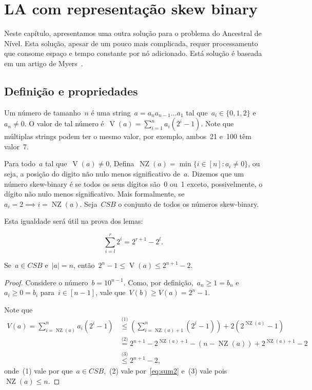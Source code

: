 \documentclass[main.tex]{subfiles}
\newcommand{\NZ}{\operatorname{NZ}}
\newcommand{\CSB}{\textit{CSB}}
\renewcommand{\V}{\operatorname{V}}
\begin{document}
\chapter{LA com representação skew binary} \label{cap:skew}

Neste capítulo, apresentamos uma outra solução para o problema do Ancestral de Nível. Esta solução, apesar de um pouco mais complicada, requer processamento que consome espaço e tempo constante por nó adicionado. Está solução é baseada em um artigo de Myers~\cite{Myers83}.

\section{Definição e propriedades}

Um número  de tamanho~$n$ é uma string~${a = a_n a_{n-1} \ldots a_1}$ tal que~${a_i \in \{0, 1, 2\}}$ e~$a_n \neq 0$. O valor de tal número é~${\V(a) = \sum\limits_{i = 1}^n{a_i (2^i - 1)}}$. Note que múltiplas strings podem ter o mesmo valor, por exemplo, ambos~21 e~100 têm valor~7.

Para todo~$a$ tal que~$\V(a) \neq 0$, Defina~$\NZ(a) = \min\{i \in [n] : a_i \neq 0\}$, ou seja, a posição do digito não nulo menos significativo de~$a$. Dizemos que um número skew-binary é  se todos os seus dígitos são~0 ou~1 exceto, possivelmente, o dígito não nulo menos significativo. Mais formalmente, se~${a_i = 2 \implies i = \NZ(a)}$. Seja~$\CSB$ o conjunto de todos os números skew-binary.

Esta igualdade será útil na prova dos lemas:

\begin{equation} \tag{A} \label{eq:sum2}
	\sum\limits_{i = l}^r{2^i} = 2^{r+1} - 2^{l}.
\end{equation}

\begin{lemma} \label{lem:csbdig}
	Se~$a \in \CSB$ e~$|a| = n$, então~$2^n - 1 \leq \V(a) \leq 2^{n+1}-2$.
\end{lemma}
\begin{proof}
	Considere o número~$b = 10^{n-1}$. Como, por definição,~$a_n \geq 1 = b_n$ e~$a_i \geq 0 = b_i$ para~$i \in [n - 1]$, vale que~$V(b) \geq V(a) = 2^n - 1$.

	Note que
	\begin{align*}
	V(a) = \sum\limits_{i = \NZ(a)}^n{a_i (2^i - 1)} &\stackrel{\text{(1)}}{\leq} \left(\sum\limits_{i = \NZ(a) + 1}^n (2^i - 1)\right) + 2 (2^{\NZ(a)} - 1) \\
	&\stackrel{\text{(2)}}{=} 2^{n+1} - 2^{\NZ(a)+1} - (n - \NZ(a)) + 2^{\NZ(a) + 1} - 2 \\
	&\stackrel{\text{(3)}}{\leq} 2^{n+1} - 2,
	\end{align*}
	onde~(1) vale por que~$a \in \CSB$,~(2) vale por~\eqref{eq:sum2} e~(3) vale pois~$\NZ(a) \leq n$.

\end{proof}
\end{document}
